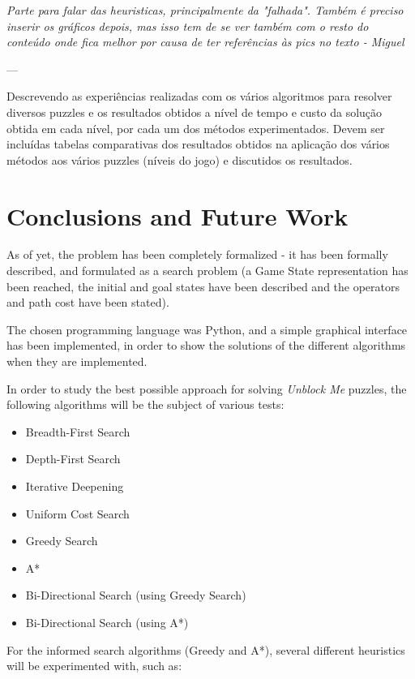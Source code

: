 \documentclass[conference]{IEEEtran}
\begin{document}
\begin{bf}
\textit{
Parte para falar das heuristicas, principalmente da "falhada". Tamb\'em \'e preciso inserir os gr\'aficos depois, mas isso tem de se ver tamb\'em com o resto do conte\'udo onde fica melhor por causa de ter referências às pics no texto - Miguel
}
\end{bf}

---

Descrevendo as experiências realizadas com os vários algoritmos para resolver diversos puzzles e os resultados obtidos a nível de tempo e custo da solução obtida em cada nível, por cada um dos métodos experimentados. Devem ser incluídas tabelas comparativas dos resultados obtidos na aplicação dos vários métodos aos vários puzzles (níveis do jogo) e discutidos os resultados.

\section{Conclusions and Future Work}
As of yet, the problem has been completely formalized - it has been formally described, and formulated as a search problem (a Game State representation has been reached, the initial and goal states have been described and the operators and path cost have been stated).

The chosen programming language was Python, and a simple graphical interface has been implemented, in order to show the solutions of the different algorithms when they are implemented.

In order to study the best possible approach for solving \textit{Unblock Me} puzzles, the following algorithms will be the subject of various tests:
\begin{itemize}
    \item Breadth-First Search
    \item Depth-First Search
    \item Iterative Deepening
    \item Uniform Cost Search
    \item Greedy Search
    \item A*
    \item Bi-Directional Search (using Greedy Search)
    \item Bi-Directional Search (using A*)
\end{itemize}

For the informed search algorithms (Greedy and A*), several different heuristics will be experimented with, such as:
\end{document}
